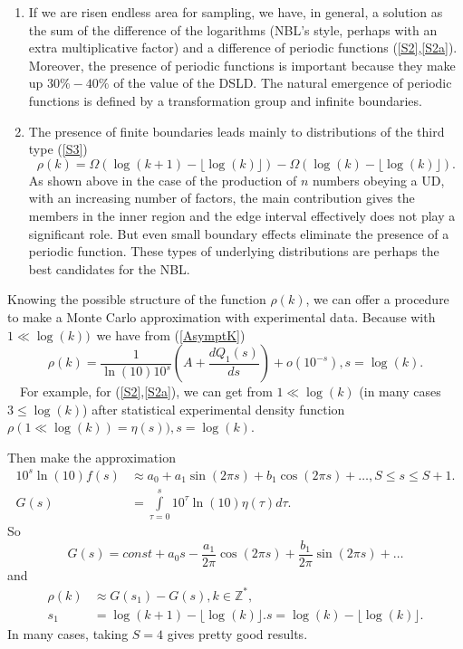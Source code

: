 \documentclass[titlepage,fleqn]{article}%
\providecommand{\U}[1]{\protect\rule{.1in}{.1in}}
\begin{document}
\begin{enumerate}
\item If we are risen endless area for sampling, we have, in general, a
solution as the sum of the difference of the logarithms (NBL's style, perhaps
with an extra multiplicative factor) and a difference of periodic functions
(\ref{S2},\ref{S2a}). Moreover, the presence of periodic functions is
important because they make up $30\%-40\%$ of the value of the DSLD. The
natural emergence of periodic functions is defined by a transformation group
and infinite boundaries.

\item The presence of finite boundaries leads mainly to distributions of the
third type (\ref{S3})%
\begin{equation}
\rho(k)=\Omega(\log(k+1)-\lfloor\log(k)\rfloor)-\Omega(\log(k)-\lfloor
\log(k)\rfloor).
\end{equation}
As shown above in the case of the production of $n$ numbers obeying a UD, with
an increasing number of factors, the main contribution gives the members in
the inner region and the edge interval effectively does not play a significant
role. But even small boundary effects eliminate the presence of a periodic
function. These types of underlying distributions are perhaps the best
candidates for the NBL.
\end{enumerate}

Knowing the possible structure of the function $\rho(k)$, we can offer a
procedure to make a Monte Carlo approximation with experimental data. Because
with $1\ll\log(k))$\ we have from (\ref{AsymptK})%
\[
\rho(k)=\frac{1}{\ln(10)10^{s}}\left(  A+\frac{dQ_{1}(s)}{ds}\right)
+o\left(  10^{-s}\right)  ,s=\log(k).
\]
\ \ For example, for (\ref{S2},\ref{S2a}), we can get from $1\ll\log(k)$ (in
many cases $3\leq\log(k)$) after statistical experimental density function
$\rho(1\ll\log(k))=\eta(s)),s=\log(k).$

Then make the approximation
\begin{align*}
10^{s}\ln(10)f(s)  &  \approx a_{0}+a_{1}\sin(2\pi s)+b_{1}\cos(2\pi
s)+\ldots,S\leq s\leq S+1.\\
G(s)  &  =%
{\displaystyle\int\limits_{\tau=0}^{s}}
10^{\tau}\ln(10)\eta(\tau)d\tau.
\end{align*}
So%
\[
G(s)=const+a_{0}s-\frac{a_{1}}{2\pi}\cos(2\pi s)+\frac{b_{1}}{2\pi}\sin(2\pi
s)+\ldots
\]
and%
\begin{align*}
\rho(k)  &  \approx G(s_{1})-G(s),k\in%
\mathbb{Z}
^{\ast},\\
s_{1}  &  =\log(k+1)-\lfloor\log(k)\rfloor.s=\log(k)-\lfloor\log(k)\rfloor.
\end{align*}
In many cases, taking $S=4$ gives pretty good results.
\end{document}
